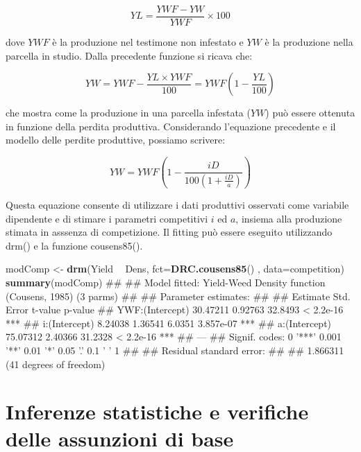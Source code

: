 \documentclass[a4paper,12pt,oneside]{book}
\newenvironment{Shaded}{\begin{snugshade}}{\end{snugshade}}
\newcommand{\KeywordTok}[1]{\textcolor[rgb]{0.13,0.29,0.53}{\textbf{#1}}}
\newcommand{\DataTypeTok}[1]{\textcolor[rgb]{0.13,0.29,0.53}{#1}}
\newcommand{\StringTok}[1]{\textcolor[rgb]{0.31,0.60,0.02}{#1}}
\newcommand{\OperatorTok}[1]{\textcolor[rgb]{0.81,0.36,0.00}{\textbf{#1}}}
\newcommand{\NormalTok}[1]{#1}
\theoremstyle{definition}
\theoremstyle{definition}
\theoremstyle{definition}
\theoremstyle{remark}
\begin{document}
\[YL = \frac{{YWF - YW}}{{YWF}} \times 100\]

dove \(YWF\) è la produzione nel testimone non infestato e \(YW\) è la
produzione nella parcella in studio. Dalla precedente funzione si ricava
che:

\[YW = YWF - \frac{YL \times YWF}{100} = YWF\left( {1 - \frac{YL}{100}} \right)\]

che mostra come la produzione in una parcella infestata (\(YW\)) può
essere ottenuta in funzione della perdita produttiva. Considerando
l'equazione precedente e il modello delle perdite produttive, possiamo
scrivere:

\[YW = YWF\left( {1 - \frac{iD}{100\left( {1 + \frac{iD}{a}} \right)}} \right)\]

Questa equazione consente di utilizzare i dati produttivi osservati come
variabile dipendente e di stimare i parametri competitivi \(i\) ed
\(a\), insiema alla produzione stimata in asssenza di competizione. Il
fitting può essere eseguito utilizzando drm() e la funzione cousens85().

\begin{Shaded}
\begin{Highlighting}[]
\NormalTok{modComp <-}\StringTok{ }\KeywordTok{drm}\NormalTok{(Yield }\OperatorTok{~}\StringTok{ }\NormalTok{Dens, }\DataTypeTok{fct=}\KeywordTok{DRC.cousens85}\NormalTok{() ,}
               \DataTypeTok{data=}\NormalTok{competition)}
\KeywordTok{summary}\NormalTok{(modComp)}
\NormalTok{## }
\NormalTok{## Model fitted: Yield-Weed Density function (Cousens, 1985) (3 parms)}
\NormalTok{## }
\NormalTok{## Parameter estimates:}
\NormalTok{## }
\NormalTok{##                 Estimate Std. Error t-value   p-value    }
\NormalTok{## YWF:(Intercept) 30.47211    0.92763 32.8493 < 2.2e-16 ***}
\NormalTok{## i:(Intercept)    8.24038    1.36541  6.0351 3.857e-07 ***}
\NormalTok{## a:(Intercept)   75.07312    2.40366 31.2328 < 2.2e-16 ***}
\NormalTok{## ---}
\NormalTok{## Signif. codes:  0 '***' 0.001 '**' 0.01 '*' 0.05 '.' 0.1 ' ' 1}
\NormalTok{## }
\NormalTok{## Residual standard error:}
\NormalTok{## }
\NormalTok{##  1.866311 (41 degrees of freedom)}
\end{Highlighting}
\end{Shaded}

\section{Inferenze statistiche e verifiche delle assunzioni di
base}\label{inferenze-statistiche-e-verifiche-delle-assunzioni-di-base}
\end{document}
